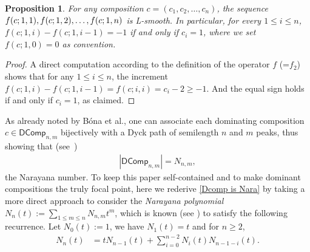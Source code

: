 \documentclass[reqno]{amsart}
\numberwithin{equation}{section}
\newtheorem{proposition}[theorem]{Proposition}
\theoremstyle{definition}
\theoremstyle{named}
\def\DComp{\mathsf{DComp}}
\begin{document}
\begin{proposition}\label{L-smooth}
For any composition $c=(c_1, c_2, \ldots, c_n)$, the sequence $f(c;1,1),\\f(c;1,2),\ldots,f(c;1,n)$ is L-smooth. In particular, for every $1\le i\le n$, $f(c;1,i)-f(c;1,i-1)=-1$ if and only if $c_i=1$, where we set $f(c;1,0)=0$ as convention.
\end{proposition}
\begin{proof}
A direct computation according to the definition of the operator $f$ (=$f_2$) shows that for any $1\le i\le n$, the increment $f(c;1,i)-f(c;1,i-1)=f(c;i,i)=c_i-2\ge -1$. And the equal sign holds if and only if $c_i=1$, as claimed.
\end{proof}

As already noted by B\'ona et al., one can associate each dominating composition $c\in\DComp_{n,m}$ bijectively with a Dyck path of semilength $n$ and $m$ peaks, thus showing that (see~\cite[Lemma~4.1]{BDL2022})
\begin{align}\label{Dcomp is Nara}
|\DComp_{n,m}|=N_{n,m},
\end{align}
the Narayana number. To keep this paper self-contained and to make dominant compositions the truly focal point, here we rederive \eqref{Dcomp is Nara} by taking a more direct approach to consider the {\it Narayana polynomial} $N_n(t):=\sum_{1\le m\le n}N_{n,m}t^m$, which is known (see \cite[Sect.~2.3]{Pet2015}) to satisfy the following recurrence. Let $N_0(t):=1$, we have $N_1(t)=t$ and for $n\ge 2$,
\begin{align}\label{rec:Narapoly}
N_n(t) &=tN_{n-1}(t)+\sum_{i=0}^{n-2} N_i(t)N_{n-1-i}(t).
\end{align}


\end{document}
